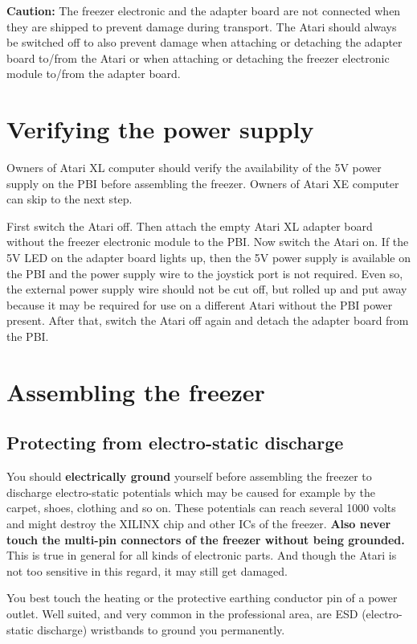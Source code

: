 \textbf{Caution:} The freezer electronic and the adapter board are not connected
when they are shipped to prevent damage during transport. The Atari should
always be switched off to also prevent damage when attaching or detaching the
adapter board to/from the Atari or when attaching or detaching the freezer
electronic module to/from the adapter board.

\section{Verifying the power supply}
\label{sec:pbi5v}

Owners of Atari XL computer should verify the availability of the 5V power
supply on the PBI before assembling the freezer. Owners of Atari XE computer can
skip to the next step.

First switch the Atari off. Then attach the empty Atari XL adapter board without
the freezer electronic module to the PBI. Now switch the Atari on. If the 5V LED
on the adapter board lights up, then the 5V power supply is available on the PBI
and the power supply wire to the joystick port is not required. Even so, the
external power supply wire should not be cut off, but rolled up and put away
because it may be required for use on a different Atari without the PBI power
present. After that, switch the Atari off again and detach the adapter board
from the PBI.

\section{Assembling the freezer}

\subsection{Protecting from electro-static discharge}

You should \textbf{electrically ground} yourself before assembling the freezer
to discharge electro-static potentials which may be caused for example by the
carpet, shoes, clothing and so on. These potentials can reach several 1000 volts
and might destroy the XILINX chip and other ICs of the freezer. \textbf{Also
never touch the multi-pin connectors of the freezer without being grounded.}
This is true in general for all kinds of electronic parts. And though the Atari
is not too sensitive in this regard, it may still get damaged.

You best touch the heating or the protective earthing conductor pin of a power
outlet. Well suited, and very common in the professional area, are ESD
(electro-static discharge) wristbands to ground you permanently.

